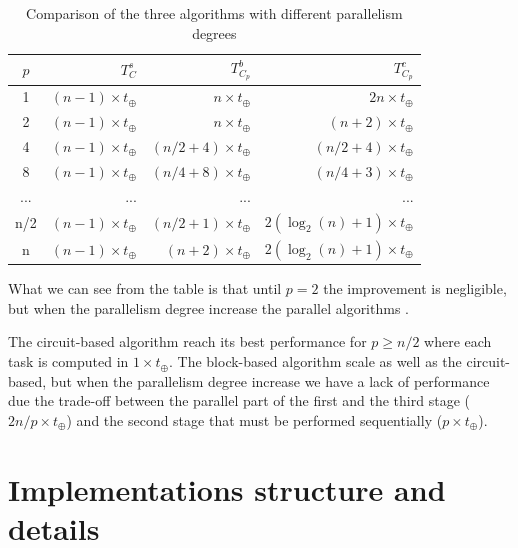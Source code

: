 \documentclass{article}
\begin{document}
\begin{table}[h]
\centering
\begin{tabular}{|c|r|r|r|}
\hline
 $p$ & $T^s_{C}$                & $T^b_{C_p}$                   & $T^c_{C_p}$ \\ \hline
  1  & $(n-1)\times t_{\oplus}$ & $n \times t_{\oplus}$         & $2n \times t_{\oplus}$\\ \hline
  2  & $(n-1)\times t_{\oplus}$ & $n \times t_{\oplus}$         & $(n+2) \times t_{\oplus}$ \\ \hline
  4  & $(n-1)\times t_{\oplus}$ & $(n/2 + 4) \times t_{\oplus}$ & $(n/2+4) \times t_{\oplus}$ \\ \hline
  8  & $(n-1)\times t_{\oplus}$ & $(n/4 + 8) \times t_{\oplus}$ & $(n/4+3) \times t_{\oplus}$ \\ \hline
 ... & ...                      & ...                           & ... \\ \hline
 n/2 & $(n-1)\times t_{\oplus}$ & $(n/2+1)\times t_{\oplus}$    & $2(\log_{2}(n) + 1) \times t_{\oplus}$ \\ \hline
  n  & $(n-1)\times t_{\oplus}$ & $(n+2)\times t_{\oplus}$      & $2(\log_{2}(n) + 1) \times t_{\oplus}$ \\ \hline
\end{tabular}
\caption{Comparison of the three algorithms with different parallelism degrees}
\end{table}

What we can see from the table is that until $p = 2$ the improvement is negligible, but when the parallelism degree increase the parallel algorithms .

The circuit-based algorithm reach its best performance for $p \geq n/2$ where each task is computed in $1 \times t_{\oplus}$. 
The block-based algorithm scale as well as the circuit-based, but when the parallelism degree increase we have a lack of performance due the trade-off between the parallel part of the first and the third stage ($2n/p \times t_{\oplus}$) and the second stage that must be performed sequentially ($p \times t_{\oplus}$).


\section{Implementations structure and details}
\end{document}
